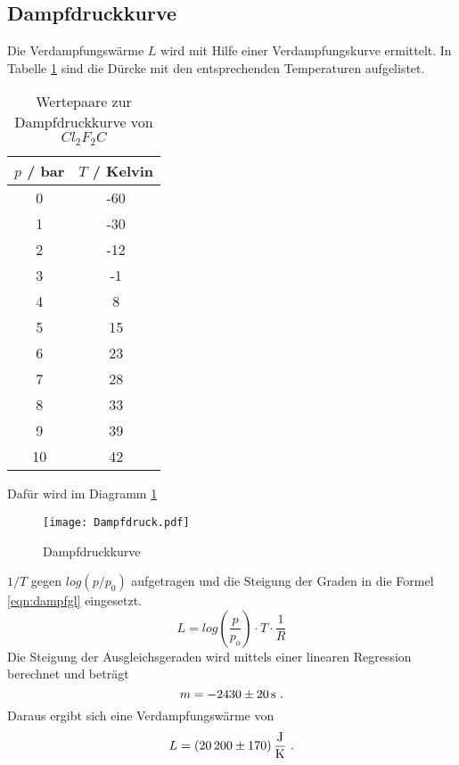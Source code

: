 \subsection{Dampfdruckkurve}
Die Verdampfungswärme $L$ wird mit Hilfe einer Verdampfungskurve ermittelt. In Tabelle \ref{tab:Dampfdruck} sind die Dürcke mit den entsprechenden Temperaturen aufgelistet.
\begin{table}
  \centering
  \begin{tabular}{c c}
    \toprule
	$p$ / bar & $T$ / Kelvin\\
    \midrule
    	0	& -60	\\
	1	& -30	\\
	2	& -12	\\
	3	& -1	\\
	4	&  8	\\
	5	&  15	\\
	6	&  23	\\
	7	&  28	\\
	8	&  33	\\
	9	&  39	\\
	10	&  42	\\
    \bottomrule
  \end{tabular}
  \caption{Wertepaare zur Dampfdruckkurve von $Cl_2F_2C$}
  \label{tab:Dampfdruck}
\end{table}
Dafür wird im Diagramm \ref{fig:dampfdruck}
\begin{figure}
  \centering
  \texttt{[image: Dampfdruck.pdf]}
  \caption{Dampfdruckkurve}
  \label{fig:dampfdruck}
\end{figure}
$1/T$ gegen $log(p/p_0)$ aufgetragen und die Steigung der Graden in die Formel \ref{eqn:dampfgl} eingesetzt.
\begin{equation}
  L = log \left( \frac{p}{p_o} \right) \cdot T \cdot \frac{1}{R}
  \label{eqn:dampfgl}
\end{equation}
Die Steigung der Ausgleichsgeraden wird mittels einer linearen Regression berechnet und beträgt
\begin{equation*}
  m = \num{-2430 +- 20} \, \text{s} \ .
\end{equation*}
Daraus ergibt sich eine Verdampfungswärme von
\begin{equation}
  L = (\num{20200 +- 170}) \, \frac{\text{J}}{\text{K}} \ .
\end{equation}
